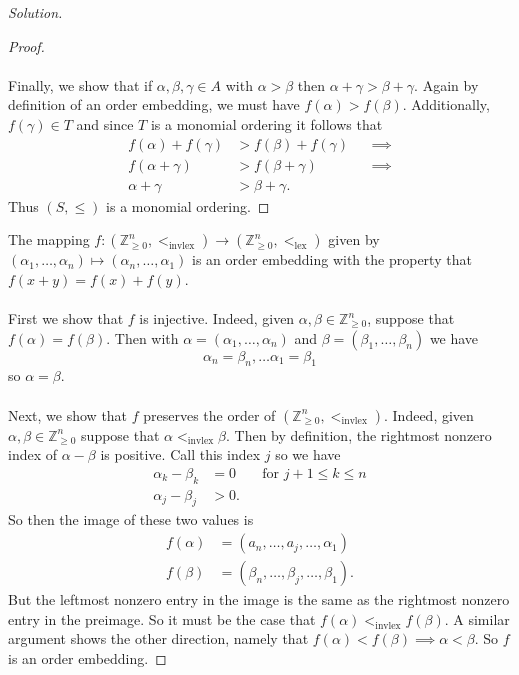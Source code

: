 \documentclass[]{article}
\newcommand\<{\langle}
\renewcommand\>{\rangle}
\newcommand{\ZZ}{\ensuremath{\mathbb{Z}}}
\newenvironment{solution}
{
	\begin{proof}[Solution] \text{ }
		\\
	}
	{
	\end{proof}
}
\begin{document}
\begin{solution}
\begin{proof}
		\\
		\\
		Finally, we show that if $\alpha, \beta, \gamma \in A$ with $\alpha > \beta$ then $\alpha + \gamma > \beta + \gamma$. Again by definition of an order embedding, we must have $f(\alpha) > f(\beta)$. Additionally, $f(\gamma) \in T$ and since $T$ is a monomial ordering it follows that
		\begin{align*}
			f(\alpha) + f(\gamma) &> f(\beta) + f(\gamma) &&\implies \\
			f(\alpha + \gamma) &> f(\beta + \gamma) &&\implies \\
			\alpha + \gamma &> \beta + \gamma.
		\end{align*}
		Thus $(S, \leq)$ is a monomial ordering.
	\end{proof}
	The mapping $f : \left( \ZZ_{\geq 0}^n, <_{\text{invlex}}\right) \to \left(\ZZ_{\geq 0}^n, <_{\text{lex}}\right)$ given by $\left(\alpha_1,\dots,\alpha_n\right) \mapsto \left(\alpha_n,\dots,\alpha_1\right)$ is an order embedding with the property that $f(x + y) = f(x) + f(y)$. 
	\\
	\\
	First we show that $f$ is injective. Indeed, given $\alpha, \beta \in \ZZ_{\geq 0}^n$, suppose that $f(\alpha) = f(\beta)$. Then with $\alpha = (\alpha_1,\dots,\alpha_n)$ and $\beta = (\beta_1,\dots,\beta_n)$ we have
	$$
		\alpha_n = \beta_n, \dots \alpha_1 = \beta_1
	$$
	so $\alpha = \beta$.
	\\
	\\
	Next, we show that $f$ preserves the order of $\left(\ZZ_{\geq 0}^n, <_{\text{invlex}}\right)$. Indeed, given $\alpha, \beta \in \ZZ_{\geq 0}^n$ suppose that $\alpha <_{\text{invlex}} \beta$. Then by definition, the rightmost nonzero index of $\alpha - \beta$ is positive. Call this index $j$ so we have
	\begin{align*}
		\alpha_k - \beta_k &= 0 && \text{for $j + 1 \leq k \leq n$} \\
		\alpha_j - \beta_j &> 0.
	\end{align*}
	So then the image of these two values is
	\begin{align*}
		f(\alpha) &= \left(a_n,\dots,a_j,\dots,\alpha_1\right) \\
		f(\beta) &= \left(\beta_n,\dots,\beta_j,\dots,\beta_1\right).
	\end{align*}
	But the leftmost nonzero entry in the image is the same as the rightmost nonzero entry in the preimage. So it must be the case that $f(\alpha) <_{\text{invlex}} f(\beta)$. A similar argument shows the other direction, namely that $f(\alpha) < f(\beta) \implies \alpha < \beta$. So $f$ is an order embedding.

\end{solution}
\end{document}
